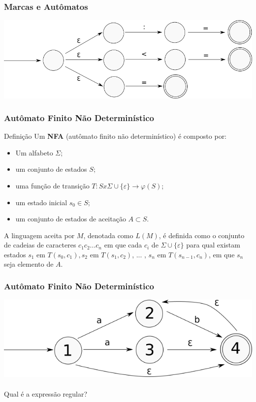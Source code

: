 \documentclass[table]{beamer}
\begin{document}
\begin{frame}
   \frametitle{Marcas e Autômatos}
   \includegraphics[width=\linewidth,height=\textheight,keepaspectratio]{figuras/menorigual04.png}
\end{frame}

\begin{frame}
   \frametitle{Autômato Finito Não Determinístico}
   \begin{block}{Definição}
   Um \textbf{NFA} (autômato finito não determinístico) é composto por:
       \begin{itemize}
          \item Um alfabeto $\Sigma$;
	  \item um conjunto de estados $S$;
	  \item uma função de transição $T:Sx\Sigma \cup \{\varepsilon\} \to \varphi(S)$;
	  \item um estado inicial $s_{0} \in S$;
	  \item um conjunto de estados de aceitação $A \subset S$.
       \end{itemize}
   A linguagem aceita por $M$, denotada como $L(M)$, é definida como o conjunto de cadeias de caracteres $c_{1}c_{2}...c_{n}$ em que cada $c_{i}$ de $\Sigma \cup \{\varepsilon\}$ para qual existam estados  $s_{1}$ em $T(s_{0},c_{1}), s_{2}$ em $T(s_{1}, c_{2})$, ... , $s_{n}$ em $T(s_{n-1}, c_{n})$, em que $s_{n}$ seja elemento de $A$.   
   \end{block}
\end{frame}

\begin{frame}
   \frametitle{Autômato Finito Não Determinístico}
   \includegraphics[width=\linewidth,height=\textheight,keepaspectratio]{figuras/exemplonfa.png}
   \\
   \\
   \centering
   Qual é a expressão regular?
\end{frame}
\end{document}
